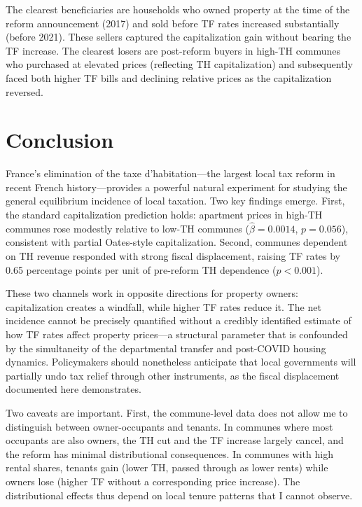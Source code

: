 \documentclass[12pt]{article}
\begin{document}
The clearest beneficiaries are households who owned property at the time of the reform announcement (2017) and sold before TF rates increased substantially (before 2021). These sellers captured the capitalization gain without bearing the TF increase. The clearest losers are post-reform buyers in high-TH communes who purchased at elevated prices (reflecting TH capitalization) and subsequently faced both higher TF bills and declining relative prices as the capitalization reversed.


\section{Conclusion}

France's elimination of the taxe d'habitation---the largest local tax reform in recent French history---provides a powerful natural experiment for studying the general equilibrium incidence of local taxation. Two key findings emerge. First, the standard capitalization prediction holds: apartment prices in high-TH communes rose modestly relative to low-TH communes ($\hat\beta = 0.0014$, $p = 0.056$), consistent with partial Oates-style capitalization. Second, communes dependent on TH revenue responded with strong fiscal displacement, raising TF rates by 0.65 percentage points per unit of pre-reform TH dependence ($p < 0.001$).

These two channels work in opposite directions for property owners: capitalization creates a windfall, while higher TF rates reduce it. The net incidence cannot be precisely quantified without a credibly identified estimate of how TF rates affect property prices---a structural parameter that is confounded by the simultaneity of the departmental transfer and post-COVID housing dynamics. Policymakers should nonetheless anticipate that local governments will partially undo tax relief through other instruments, as the fiscal displacement documented here demonstrates.

Two caveats are important. First, the commune-level data does not allow me to distinguish between owner-occupants and tenants. In communes where most occupants are also owners, the TH cut and the TF increase largely cancel, and the reform has minimal distributional consequences. In communes with high rental shares, tenants gain (lower TH, passed through as lower rents) while owners lose (higher TF without a corresponding price increase). The distributional effects thus depend on local tenure patterns that I cannot observe.
\end{document}
